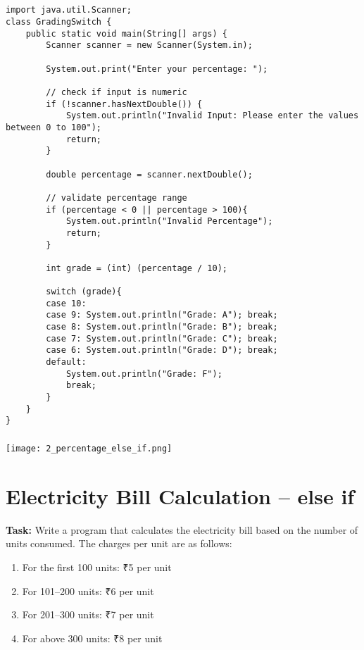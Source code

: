\documentclass[12pt,a4paper]{article}
\begin{document}
\subsection{}
\begin{lstlisting}
import java.util.Scanner;
class GradingSwitch {
    public static void main(String[] args) {
        Scanner scanner = new Scanner(System.in);
    
        System.out.print("Enter your percentage: ");
    
        // check if input is numeric
        if (!scanner.hasNextDouble()) {
            System.out.println("Invalid Input: Please enter the values between 0 to 100");
            return;
        }
    
        double percentage = scanner.nextDouble();
    
        // validate percentage range
        if (percentage < 0 || percentage > 100){
            System.out.println("Invalid Percentage");
            return;
        }
    
        int grade = (int) (percentage / 10);
    
        switch (grade){
        case 10:
        case 9: System.out.println("Grade: A"); break;
        case 8: System.out.println("Grade: B"); break;
        case 7: System.out.println("Grade: C"); break;
        case 6: System.out.println("Grade: D"); break;
        default:
            System.out.println("Grade: F");
            break;
        }
    }
}
\end{lstlisting}

\subsubsection{}
\begin{center}
    \texttt{[image: 2\_percentage\_else\_if.png]}
\end{center}

\section{Electricity Bill Calculation -- else if}
\textbf{Task:} Write a program that calculates the electricity bill based on the number of units consumed. The charges per unit are as follows:
\begin{enumerate}
    \item For the first 100 units: ₹5 per unit
    \item For 101--200 units: ₹6 per unit
    \item For 201--300 units: ₹7 per unit
    \item For above 300 units: ₹8 per unit
\end{enumerate}
\end{document}
